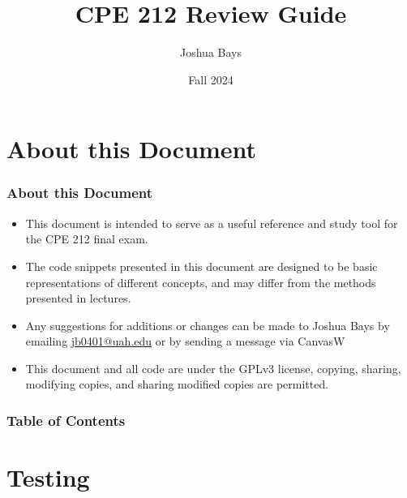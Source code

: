 \documentclass[c, aspectratio=169]{beamer}
\title{CPE 212 Review Guide}
\author{Joshua Bays}\date{Fall 2024}
\institute{Univeristy of Alabama in Huntsville}
\begin{document}
\begin{frame}
\titlepage
\end{frame}

\section*{About this Document}
\begin{frame}\frametitle{About this Document}
\begin{itemize}
\item This document is intended to serve as a useful reference and study tool for the CPE 212 final exam.
\item The code snippets presented in this document are designed to be basic representations of different concepts, and may differ from the methods presented in lectures.
\item Any suggestions for additions or changes can be made to Joshua Bays by emailing \href{mailto:jb0401@uah.edu}{jb0401@uah.edu} or by sending a message via CanvasW
\item This document and all code are under the GPLv3 license, copying, sharing, modifying copies, and sharing modified copies are permitted.
\end{itemize}
\end{frame}

\begin{frame}\frametitle{Table of Contents}
\begin{multicols}{2}
\tableofcontents
\end{multicols}
\end{frame}






\section{Testing}


\end{document}
